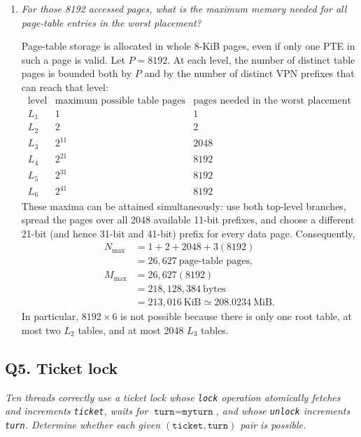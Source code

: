 \begin{enumerate}
\item[(e)] \emph{For those 8192 accessed pages, what is the maximum memory
needed for all page-table entries in the worst placement?}

Page-table storage is allocated in whole 8-KiB pages, even if only one PTE
in such a page is valid.  Let \(P=8192\).  At each level, the number of
distinct table pages is bounded both by \(P\) and by the number of distinct
VPN prefixes that can reach that level:
\[
\begin{array}{c|c|c}
\mbox{level} & \mbox{maximum possible table pages} &
              \mbox{pages needed in the worst placement}\\ \hline
L_1 & 1       & 1\\
L_2 & 2       & 2\\
L_3 & 2^{11}  & 2048\\
L_4 & 2^{21}  & 8192\\
L_5 & 2^{31}  & 8192\\
L_6 & 2^{41}  & 8192
\end{array}
\]
These maxima can be attained simultaneously: use both top-level branches,
spread the pages over all 2048 available 11-bit prefixes, and choose a
different 21-bit (and hence 31-bit and 41-bit) prefix for every data page.
Consequently,
\[
\begin{split}
N_{\max}
 &=1+2+2048+3(8192)\\
 &=26{,}627\ \mbox{page-table pages},\\
M_{\max}
 &=26{,}627(8192)\\
 &=218{,}128{,}384\ \mbox{bytes}\\
 &=213{,}016\ \mbox{KiB}
 \mathrel{\simeq}208.0234\ \mbox{MiB}.
\end{split}
\]
In particular, \(8192\times6\) is not possible because there is only one
root table, at most two \(L_2\) tables, and at most 2048 \(L_3\) tables.
\end{enumerate}

\subsection*{Q5. Ticket lock}

\emph{Ten threads correctly use a ticket lock whose \texttt{lock} operation
atomically fetches and increments \texttt{ticket}, waits for
\(\texttt{turn}=\texttt{myturn}\), and whose \texttt{unlock} increments
\texttt{turn}.  Determine whether each given
\((\texttt{ticket},\texttt{turn})\) pair is possible.}

